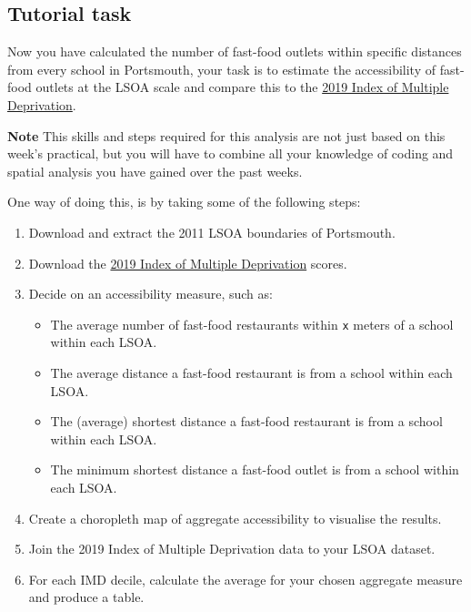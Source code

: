 \documentclass[
]{book}
\providecommand{\tightlist}{%
  \setlength{\itemsep}{0pt}\setlength{\parskip}{0pt}}
\begin{document}
\hypertarget{task-w10}{%
\subsection{Tutorial task}\label{task-w10}}

Now you have calculated the number of fast-food outlets within specific distances from every school in Portsmouth, your task is to estimate the accessibility of fast-food outlets at the LSOA scale and compare this to the \href{https://www.gov.uk/government/statistics/english-indices-of-deprivation-2019}{2019 Index of Multiple Deprivation}.

\textbf{Note}
This skills and steps required for this analysis are not just based on this week's practical, but you will have to combine all your knowledge of coding and spatial analysis you have gained over the past weeks.

One way of doing this, is by taking some of the following steps:

\begin{enumerate}
\def\labelenumi{\arabic{enumi}.}
\tightlist
\item
  Download and extract the 2011 LSOA boundaries of Portsmouth.
\item
  Download the \href{https://www.gov.uk/government/statistics/english-indices-of-deprivation-2019}{2019 Index of Multiple Deprivation} scores.
\item
  Decide on an accessibility measure, such as:

  \begin{itemize}
  \tightlist
  \item
    The average number of fast-food restaurants within \texttt{x} meters of a school within each LSOA.
  \item
    The average distance a fast-food restaurant is from a school within each LSOA.
  \item
    The (average) shortest distance a fast-food restaurant is from a school within each LSOA.
  \item
    The minimum shortest distance a fast-food outlet is from a school within each LSOA.
  \end{itemize}
\item
  Create a choropleth map of aggregate accessibility to visualise the results.
\item
  Join the 2019 Index of Multiple Deprivation data to your LSOA dataset.
\item
  For each IMD decile, calculate the average for your chosen aggregate measure and produce a table.
\end{enumerate}
\end{document}
